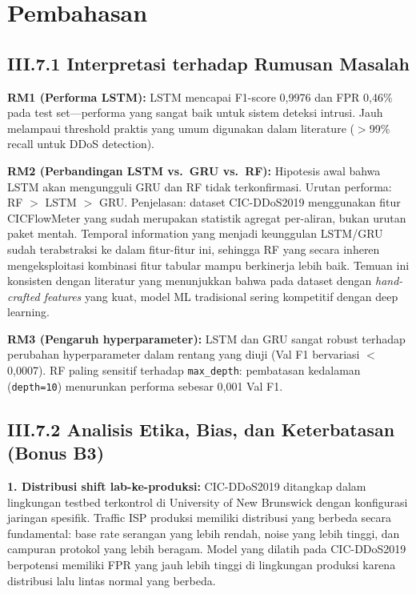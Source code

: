 \documentclass[11pt,a4paper,oneside]{report}
\begin{document}
\section{Pembahasan}

\subsection*{III.7.1 Interpretasi terhadap Rumusan Masalah}

\textbf{RM1 (Performa LSTM):} LSTM mencapai F1-score 0,9976 dan FPR 0,46\% pada test set---performa yang sangat baik untuk sistem deteksi intrusi. Jauh melampaui threshold praktis yang umum digunakan dalam literature ($>$99\% recall untuk DDoS detection).

\textbf{RM2 (Perbandingan LSTM vs.\ GRU vs.\ RF):} Hipotesis awal bahwa LSTM akan mengungguli GRU dan RF tidak terkonfirmasi. Urutan performa: RF $>$ LSTM $>$ GRU. Penjelasan: dataset CIC-DDoS2019 menggunakan fitur CICFlowMeter yang sudah merupakan statistik agregat per-aliran, bukan urutan paket mentah. Temporal information yang menjadi keunggulan LSTM/GRU sudah terabstraksi ke dalam fitur-fitur ini, sehingga RF yang secara inheren mengeksploitasi kombinasi fitur tabular mampu berkinerja lebih baik. Temuan ini konsisten dengan literatur yang menunjukkan bahwa pada dataset dengan \textit{hand-crafted features} yang kuat, model ML tradisional sering kompetitif dengan deep learning.

\textbf{RM3 (Pengaruh hyperparameter):} LSTM dan GRU sangat robust terhadap perubahan hyperparameter dalam rentang yang diuji (Val F1 bervariasi $<$0,0007). RF paling sensitif terhadap \texttt{max\_depth}: pembatasan kedalaman (\texttt{depth=10}) menurunkan performa sebesar 0,001 Val F1.

\subsection*{III.7.2 Analisis Etika, Bias, dan Keterbatasan (Bonus B3)}

\textbf{1. Distribusi shift lab-ke-produksi:} CIC-DDoS2019 ditangkap dalam lingkungan testbed terkontrol di University of New Brunswick dengan konfigurasi jaringan spesifik. Traffic ISP produksi memiliki distribusi yang berbeda secara fundamental: base rate serangan yang lebih rendah, noise yang lebih tinggi, dan campuran protokol yang lebih beragam. Model yang dilatih pada CIC-DDoS2019 berpotensi memiliki FPR yang jauh lebih tinggi di lingkungan produksi karena distribusi lalu lintas normal yang berbeda.
\end{document}
